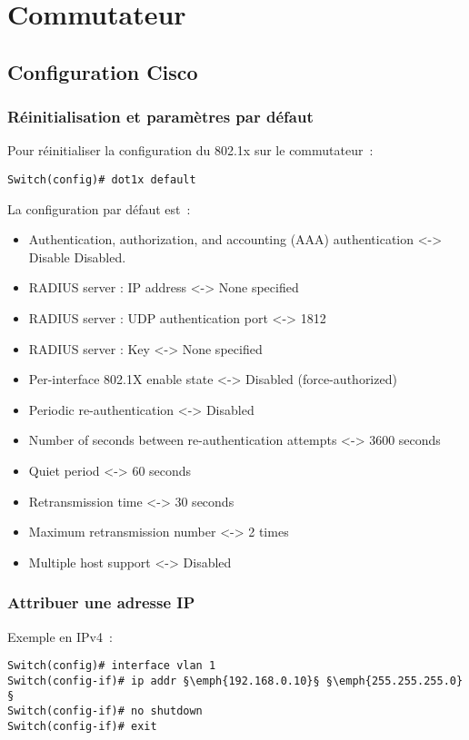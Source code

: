 \section{Commutateur}
\subsection{Configuration Cisco}
\subsubsection{Réinitialisation et paramètres par défaut}

Pour réinitialiser la configuration du 802.1x sur le commutateur~:

\begin{lstlisting}
Switch(config)# dot1x default
\end{lstlisting}

La configuration par défaut est~:

\begin{itemize}
\item Authentication, authorization, and accounting (AAA) authentication <-> Disable Disabled. 
\item RADIUS server : IP address <-> None specified
\item RADIUS server : UDP authentication port <-> 1812
\item RADIUS server : Key <-> None specified
\item Per-interface 802.1X enable state <-> Disabled (force-authorized)
\item Periodic re-authentication <-> Disabled
\item Number of seconds between re-authentication attempts <-> 3600 seconds
\item Quiet period <-> 60 seconds
\item Retransmission time <-> 30 seconds
\item Maximum retransmission number <-> 2 times
\item Multiple host support <-> Disabled
\end{itemize}

\subsubsection{Attribuer une adresse IP}

Exemple en IPv4~:

\begin{lstlisting}
Switch(config)# interface vlan 1
Switch(config-if)# ip addr §\emph{192.168.0.10}§ §\emph{255.255.255.0}§
Switch(config-if)# no shutdown
Switch(config-if)# exit
\end{lstlisting}

